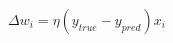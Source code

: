 \documentclass[preview]{standalone}
\begin{document}
\begin{align*}
\Delta w_i = \eta (y_{true} - y_{pred}) x_i
\end{align*}
\end{document}
